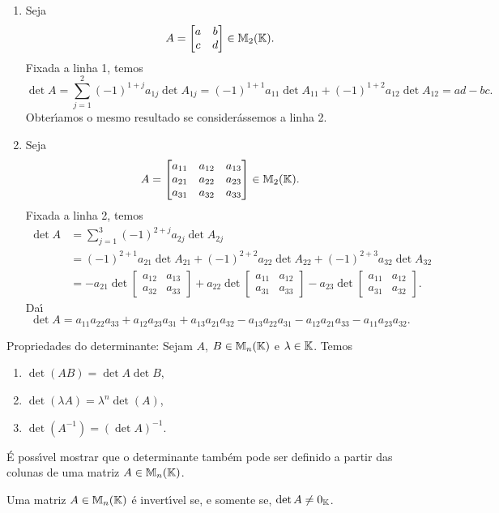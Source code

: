 \begin{exemplo}
	\begin{enumerate}
		\item Seja
		\[
			A = \begin{bmatrix}
				a & b\\
				c & d
			\end{bmatrix} \in \mathbb{M}_2(\mathbb{K}).
		\]
		Fixada a linha 1, temos
		\[
			\det A = \sum_{j = 1}^2(-1)^{1 + j}a_{1j}\det A_{1j} = (-1)^{1 + 1}a_{11}\det A_{11} + (-1)^{1 + 2}a_{12}\det A_{12} = ad - bc.
		\]
		Obter{\'\i}amos o mesmo resultado se consider\'assemos a linha 2.

		\item Seja
		\[
			A = \begin{bmatrix}
				a_{11} & a_{12} & a_{13}\\
				a_{21} & a_{22} & a_{23}\\
				a_{31} & a_{32} & a_{33}
			\end{bmatrix} \in \mathbb{M}_2(\mathbb{K}).
		\]
		Fixada a linha 2, temos
		\begin{align*}
			\det A &= \sum_{j = 1}^3(-1)^{2 + j}a_{2j}\det A_{2j} \\ &= (-1)^{2 + 1}a_{21}\det A_{21} + (-1)^{2 + 2}a_{22}\det A_{22} + (-1)^{2 + 3}a_{32}\det A_{32}\\ &= -a_{21}\det\begin{bmatrix}a_{12} & a_{13}\\a_{32} & a_{33}\end{bmatrix} + a_{22}\det\begin{bmatrix}a_{11} & a_{12}\\a_{31} & a_{33}\end{bmatrix} - a_{23}\det\begin{bmatrix}a_{11} & a_{12}\\a_{31} & a_{32}\end{bmatrix}.
		\end{align*}
		Da{\'\i}
		\[
			\det A = a_{11}a_{22}a_{33} + a_{12}a_{23}a_{31} + a_{13}a_{21}a_{32} - a_{13}a_{22}a_{31} - a_{12}a_{21}a_{33} - 
			a_{11}a_{23}a_{32}.
		\]
	\end{enumerate}
\end{exemplo}

Propriedades do determinante: Sejam $A$, $B \in \mathbb{M}_n(\mathbb{K})$ e $\lambda \in \mathbb{K}$. Temos
\begin{enumerate}
	\item $\det(AB) = \det A \det B$,
	\item $\det(\lambda A) = \lambda^n \det(A)$,
	\item $\det(A^{-1}) = (\det A)^{-1}$.
\end{enumerate}

\begin{observacao}
\'E poss{\'\i}vel mostrar que o determinante tamb\'em pode ser definido a partir das colunas de uma matriz $A \in \mathbb{M}_n(\mathbb{K})$.
\end{observacao}

\begin{teorema}
	Uma matriz $A \in \mathbb{M}_n(\mathbb{K})$ \'e invert{\'\i}vel se, e somente se, $\det A \ne 0_{\mathbb{K}}$.
\end{teorema}